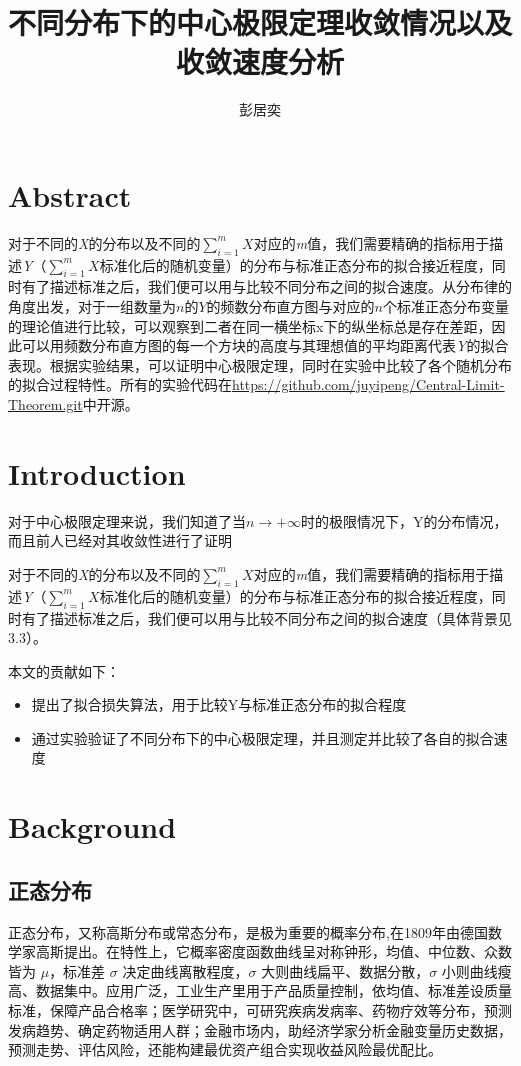 \documentclass{article}
\title{不同分布下的中心极限定理收敛情况以及收敛速度分析}
\author{彭居奕}
\begin{document}
\maketitle
\section{Abstract}
对于不同的\textit{X}的分布以及不同的$\sum_{i=1}^{m}X$对应的\textit{m}值，我们需要精确的指标用于描述\textit{Y}（$\sum_{i=1}^{m}X$标准化后的随机变量）的分布与标准正态分布的拟合接近程度，同时有了描述标准之后，我们便可以用与比较不同分布之间的拟合速度。从分布律的角度出发，对于一组数量为$n$的$Y$的频数分布直方图与对应的$n$个标准正态分布变量的理论值进行比较，可以观察到二者在同一横坐标x下的纵坐标总是存在差距，因此可以用频数分布直方图的每一个方块的高度与其理想值的平均距离代表\textit{Y}的拟合表现。根据实验结果，可以证明中心极限定理，同时在实验中比较了各个随机分布的拟合过程特性。所有的实验代码在\url{https://github.com/juyipeng/Central-Limit-Theorem.git}中开源。
\section{Introduction}

对于中心极限定理\cite{laplace}来说，我们知道了当$n\to+\infty$时的极限情况下，Y的分布情况，而且前人已经对其收敛性进行了证明\cite{Liapounov1901}

对于不同的\textit{X}的分布以及不同的$\sum_{i=1}^{m}X$对应的\textit{m}值，我们需要精确的指标用于描述\textit{Y}（$\sum_{i=1}^{m}X$标准化后的随机变量）的分布与标准正态分布的拟合接近程度，同时有了描述标准之后，我们便可以用与比较不同分布之间的拟合速度（具体背景见3.3）。

本文的贡献如下：
\begin{itemize}
\item 提出了拟合损失算法，用于比较Y与标准正态分布的拟合程度
\item 通过实验验证了不同分布下的中心极限定理，并且测定并比较了各自的拟合速度
\end{itemize}



\section{Background}

\subsection{正态分布}
正态分布\cite{gauss}，又称高斯分布或常态分布，是极为重要的概率分布,在1809年由德国数学家高斯提出。在特性上，它概率密度函数曲线呈对称钟形，均值、中位数、众数皆为 $\mu$，标准差 $\sigma$ 决定曲线离散程度，$\sigma$ 大则曲线扁平、数据分散，$\sigma$ 小则曲线瘦高、数据集中。应用广泛，工业生产里用于产品质量控制，依均值、标准差设质量标准，保障产品合格率；医学研究中，可研究疾病发病率、药物疗效等分布，预测发病趋势、确定药物适用人群；金融市场内，助经济学家分析金融变量历史数据，预测走势、评估风险，还能构建最优资产组合实现收益风险最优配比。
\end{document}
